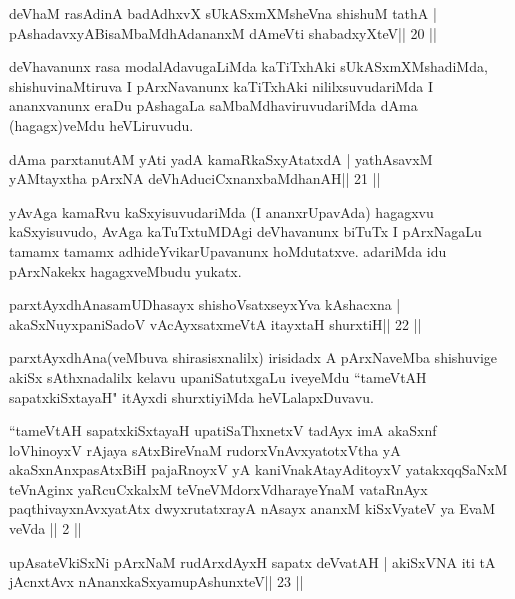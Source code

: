 \begin{shl}
deVhaM rasAdinA badAdhxvX sUkASxmXMsheVna shishuM tathA |
pAshadavxyABisaMbaMdhAdananxM dAmeVti shabadxyXteV\hfill || 20 ||
\end{shl}

\begin{artha}
deVhavanunx rasa modalAdavugaLiMda kaTiTxhAki sUkASxmXMshadiMda, shishuvinaMtiruva I pArxNavanunx kaTiTxhAki nililxsuvudariMda I ananxvanunx eraDu pAshagaLa saMbaMdhaviruvudariMda dAma (hagagx)veMdu heVLiruvudu.
\end{artha}

\begin{shl}
dAma parxtanutAM yAti yadA kamaRkaSxyAtatxdA |
yathAsavxM yAMtayxtha pArxNA deVhAduciCxnanxbaMdhanAH\hfill || 21 ||
\end{shl}

\begin{artha}
yAvAga kamaRvu kaSxyisuvudariMda (I ananxrUpavAda) hagagxvu kaSxyisuvudo, AvAga kaTuTxtuMDAgi deVhavanunx biTuTx I pArxNagaLu tamamx tamamx adhideYvikarUpavanunx hoMdutatxve. adariMda idu pArxNakekx hagagxveMbudu yukatx.
\end{artha}

\begin{shl}
parxtAyxdhAnasamUDhasayx shishoVsatxseyxYva kAshacxna |
akaSxNuyxpaniSadoV vAcAyxsatxmeVtA itayxtaH shurxtiH\hfill || 22 ||
\end{shl}

\begin{artha}
parxtAyxdhAna(veMbuva shirasisxnalilx) irisidadx A pArxNaveMba shishuvige akiSx sAthxnadalilx kelavu upaniSatutxgaLu iveyeMdu ``tameVtAH sapatxkiSxtayaH" itAyxdi shurxtiyiMda heVLalapxDuvavu.
\end{artha}


{}

\begin{kandikeshl}
``tameVtAH sapatxkiSxtayaH upatiSaThxnetxV tadAyx imA akaSxnf
  loVhinoyxV rAjaya sAtxBireVnaM rudorxV\s nAvxyatotxV\s tha yA
  akaSxnAnxpasAtxBiH pajaRnoyxV yA kaniVnakAtayA\s ditoyxV
  yatakxqqSaNxM teVnAginx yaRcuCxkalxM teVneVMdorxV\s dharayeYnaM
  vataRnAyx paqthivayxnAvxyatAtx dwyxrutatxrayA nAsayx ananxM
  kiSxVyateV ya EvaM veVda || 2 || 
\end{kandikeshl}


\begin{shl}
upAsateV\s kiSxNi pArxNaM rudArxdAyxH sapatx deVvatAH |
akiSxVNA iti tA jAcnxtAvx nAnanxkaSxyamupAshunxteV\hfill || 23 ||
\end{shl}

